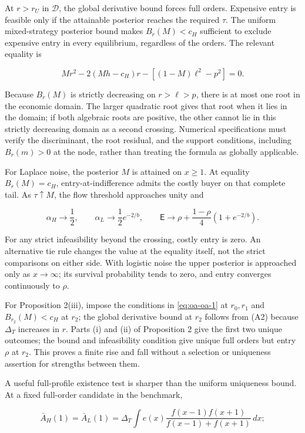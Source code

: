 \documentclass[
  11pt,
]{article}
\begin{document}
At \(r>r_U\) in \(\mathcal D\), the global derivative bound forces full
orders. Expensive entry is feasible only if the attainable posterior
reaches the required \(\tau\). The uniform mixed-strategy posterior
bound makes \(B_r(M)<c_H\) sufficient to exclude expensive entry in
every equilibrium, regardless of the orders. The relevant equality is

\[
Mr^2-2(Mh-c_H)r-[(1-M)\ell^2-p^2]=0.
\tag{OA.20}\label{eq:oa-oa-20}
\]

Because \(B_r(M)\) is strictly decreasing on \(r>\ell>p\), there is at
most one root in the economic domain. The larger quadratic root gives
that root when it lies in the domain; if both algebraic roots are
positive, the other cannot lie in this strictly decreasing domain as a
second crossing. Numerical specifications must verify the discriminant,
the root residual, and the support conditions, including \(B_r(m)>0\) at the node, rather than
treating the formula as globally applicable.

For Laplace noise, the posterior \(M\) is attained on \(x\ge1\). At
equality \(B_r(M)=c_H\), entry-at-indifference admits the costly buyer
on that complete tail. As \(\tau\uparrow M\), the flow threshold
approaches unity and

\[
\alpha_H\to\frac12,\qquad \alpha_L\to\frac12e^{-2/b},\qquad
\mathsf E\to\rho+\frac{1-\rho}{4}(1+e^{-2/b}).
\tag{OA.21}\label{eq:oa-oa-21}
\]

For any strict infeasibility beyond the crossing, costly entry is zero.
An alternative tie rule changes the value at the equality itself, not
the strict comparisons on either side. With logistic noise the upper
posterior is approached only as \(x\to\infty\); its survival probability
tends to zero, and entry converges continuously to \(\rho\).

For Proposition 2(iii), impose the conditions in \eqref{eq:oa-oa-1} at \(r_0,r_1\) and \(B_{r_2}(M)<c_H\) at \(r_2\); the global derivative bound at \(r_2\) follows from (A2) because \(\Delta_T\) increases in \(r\). Parts (i) and (ii) of Proposition 2 give the first
two unique outcomes; the bound and infeasibility condition give unique
full orders but entry \(\rho\) at \(r_2\). This proves a finite rise and
fall without a selection or uniqueness assertion for strengths between
them.

A useful full-profile existence test is sharper than the uniform
uniqueness bound. At a fixed full-order candidate in the benchmark,

\[
\bar A_H(1)=\bar A_L(1)
=\Delta_T\int e(x)\frac{f(x-1)f(x+1)}{f(x-1)+f(x+1)}\,dx;
\tag{OA.22}\label{eq:oa-oa-22}
\]
\end{document}
